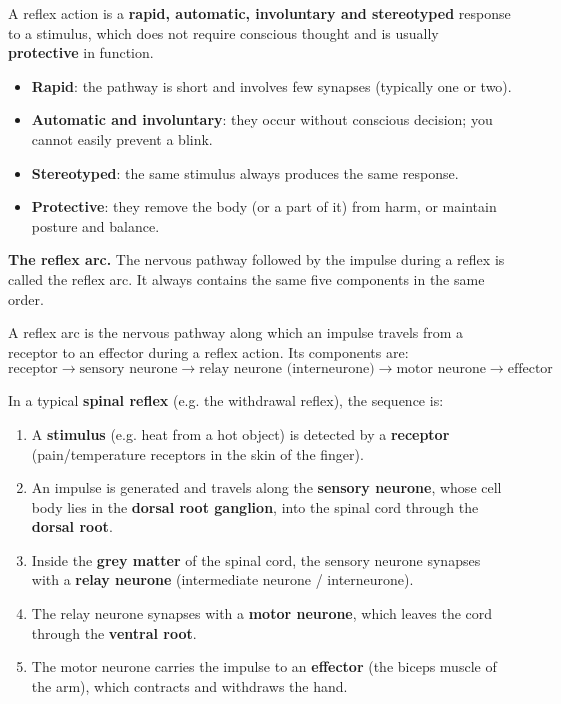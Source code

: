 \documentclass[11pt]{article}
\newcommand{\cle}[1]{{\popxbold\color{popdark}#1}}
\begin{document}
\begin{definition}
A \cle{reflex action} is a \textbf{rapid, automatic, involuntary and stereotyped} response to a stimulus, which does not require conscious thought and is usually \textbf{protective} in function.
\end{definition}

\begin{aretenir}
\begin{itemize}
\item \textbf{Rapid}: the pathway is short and involves few synapses (typically one or two).
\item \textbf{Automatic and involuntary}: they occur without conscious decision; you cannot easily prevent a blink.
\item \textbf{Stereotyped}: the same stimulus always produces the same response.
\item \textbf{Protective}: they remove the body (or a part of it) from harm, or maintain posture and balance.
\end{itemize}
\end{aretenir}

\textbf{The reflex arc.} The nervous pathway followed by the impulse during a reflex is called the \cle{reflex arc}. It always contains the same five components in the same order.

\begin{definition}
A \cle{reflex arc} is the nervous pathway along which an impulse travels from a receptor to an effector during a reflex action. Its components are:
\[
\text{receptor} \longrightarrow \text{sensory neurone} \longrightarrow \text{relay neurone (interneurone)} \longrightarrow \text{motor neurone} \longrightarrow \text{effector}
\]
\end{definition}

In a typical \textbf{spinal reflex} (e.g. the withdrawal reflex), the sequence is:

\begin{enumerate}
\item A \textbf{stimulus} (e.g. heat from a hot object) is detected by a \textbf{receptor} (pain/temperature receptors in the skin of the finger).
\item An impulse is generated and travels along the \textbf{sensory neurone}, whose cell body lies in the \textbf{dorsal root ganglion}, into the spinal cord through the \textbf{dorsal root}.
\item Inside the \textbf{grey matter} of the spinal cord, the sensory neurone synapses with a \textbf{relay neurone} (intermediate neurone / interneurone).
\item The relay neurone synapses with a \textbf{motor neurone}, which leaves the cord through the \textbf{ventral root}.
\item The motor neurone carries the impulse to an \textbf{effector} (the biceps muscle of the arm), which contracts and withdraws the hand.
\end{enumerate}
\end{document}
